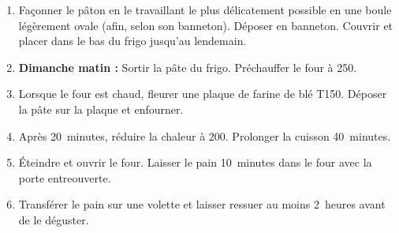 \begin{recipe}
\begin{enumerate}
  \item Façonner le pâton en le travaillant le plus délicatement
    possible en une boule légèrement ovale (afin, selon son banneton).
    Déposer en banneton.  Couvrir et placer dans le bas du frigo
    jusqu'au lendemain.
    
  \item \textbf{Dimanche matin : } Sortir la pâte du frigo.  Préchauffer le
    four à 250\degreeC.

  \item Lorsque le four est chaud, fleurer une plaque de farine de blé
    T150.  Déposer la pâte sur la plaque et enfourner.
    
  \item Après 20~minutes, réduire la chaleur à 200\degreeC.  Prolonger
    la cuisson 40~minutes.
    
  \item Éteindre et ouvrir le four.  Laisser le pain 10~minutes dans
    le four avec la porte entreouverte.
    
  \item Transférer le pain sur une volette et laisser ressuer au moins
    2~heures avant de le déguster.

  \end{enumerate}
\end{recipe}

